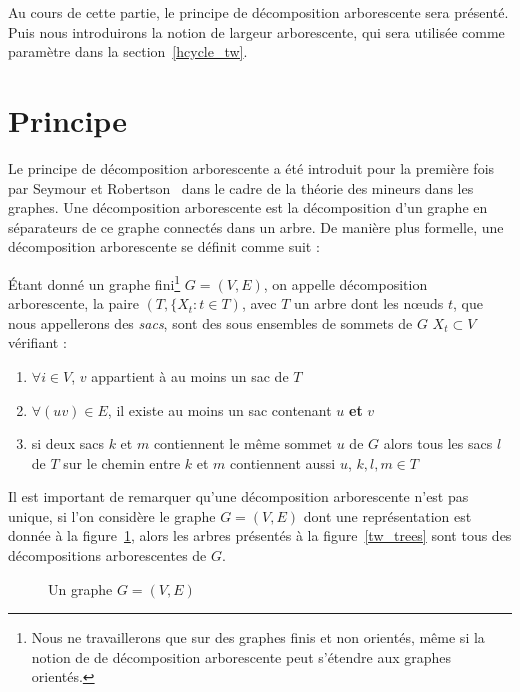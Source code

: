 Au cours de cette partie, le principe de décomposition arborescente sera présenté. Puis nous
introduirons la notion de largeur arborescente, qui sera utilisée comme paramètre dans la
section~\ref{hcycle_tw}.

\section{Principe}

Le principe de décomposition arborescente a été introduit pour la première fois par Seymour et
Robertson~\cite{robalgorithmic} dans le cadre de la théorie des mineurs dans les graphes. Une
décomposition arborescente est la décomposition d'un graphe en séparateurs de ce graphe connectés
dans un arbre. De manière plus formelle, une décomposition arborescente se définit comme suit :

\begin{ndf}
    Étant donné un graphe fini\footnote{Nous ne travaillerons que sur des graphes finis et non
        orientés, même si la notion de de décomposition arborescente peut s'étendre aux graphes
    orientés.} $G = (V, E)$, on appelle décomposition arborescente, la paire $(T, \{X_t : t \in T)$,
    avec $T$ un arbre dont les n\oe uds $t$, que nous appellerons des \emph{sacs}, sont des sous
    ensembles de sommets de $G$ $X_t \subset V$ vérifiant : 
    \begin{enumerate}
        \item $\forall i \in V$, $v$ appartient à au moins un sac de $T$
        \item $\forall (uv) \in E$, il existe au moins un sac contenant $u$ \textbf{et} $v$
        \item si deux sacs $k$ et $m$ contiennent le même sommet $u$ de $G$ alors tous les sacs $l$
            de $T$ sur le chemin entre $k$ et $m$ contiennent aussi $u$, $k, l, m \in T$
    \end{enumerate}
\end{ndf}

Il est important de remarquer qu'une décomposition arborescente n'est pas unique, si l'on considère
le graphe $G = (V, E)$ dont une représentation est donnée à la figure~\ref{tw_g}, alors les arbres
présentés à la figure~\ref{tw_trees} sont tous des décompositions arborescentes de $G$.

\begin{figure}
    \begin{center}
        \begin{tikzpicture}
            
        \end{tikzpicture}
        \caption{Un graphe $G = (V, E)$}
        \label{tw_g}
    \end{center}
\end{figure}

